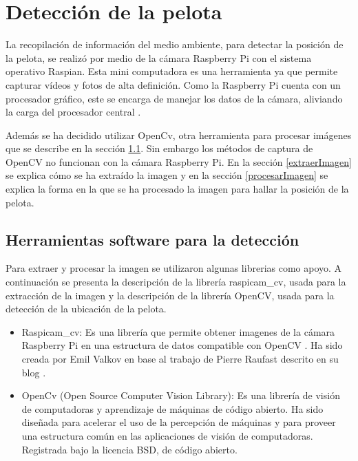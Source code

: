 \section{Detección de la pelota}\label{chapter:deteccion}

La recopilación de información del medio ambiente, para detectar la posición de la pelota, se realiz\'o por medio de la cámara Raspberry Pi con el sistema operativo Raspian. Esta mini computadora es una herramienta ya que permite capturar v\'ideos y fotos de alta definici\'on. Como la Raspberry Pi cuenta con un procesador gr\'afico, este se encarga de manejar los datos de la cámara, aliviando la carga del procesador central \cite{raspCamArti}.

Además se ha decidido utilizar OpenCv, otra herramienta para procesar im\'agenes que se describe en la sección \ref{herramientasDetc}. Sin embargo los métodos de captura de OpenCV no funcionan con la c\'amara Raspberry Pi. En la secci\'on \ref{extraerImagen} se explica c\'omo se ha extra\'ido la imagen y en la secci\'on \ref{procesarImagen} se explica la forma en la que se ha procesado la imagen para hallar la posición de la pelota. 

\subsection{Herramientas software para la detecci\'on }\label{herramientasDetc}

Para extraer y procesar la imagen se utilizaron algunas librerias como apoyo. A continuación se presenta la descripción de la librería raspicam\_cv, usada para la extracción de la imagen y la descripción de la librería OpenCV, usada para la detección de la ubicación de la pelota.   

\begin{itemize}

\item Raspicam\_cv: Es una librería que permite obtener imagenes de la cámara Raspberry Pi en una estructura de datos compatible con OpenCV \cite{emilV}. Ha sido creada por Emil Valkov en base al trabajo de Pierre Raufast descrito en su blog \cite{pierreR}.  

\item OpenCv (Open Source Computer Vision Library): Es una librería de visión de computadoras y aprendizaje de máquinas de código abierto. Ha sido diseñada para acelerar el uso de la percepción de m\'aquinas y para proveer una estructura común en las aplicaciones de visión de computadoras. Registrada bajo la licencia BSD, de código abierto. \cite{opencv}

\end{itemize}

